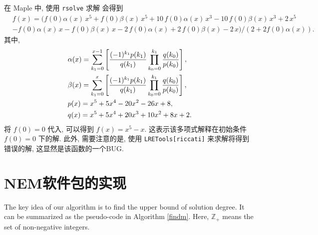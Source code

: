 \begin{example}
在 Maple 中, 使用 \texttt{rsolve} 求解  会得到
\begin{equation}
\begin{split}
    &f(x)=(f \left( 0 \right) \alpha(x)\,{x}^{5}+f \left( 0 \right) \beta(x)\,{x}^{5}+10\,f \left( 0 \right) \alpha(x)\,{x}^{3}-10\,f \left( 0 \right) \beta(x)\,{x}^{3}+2\,{x}^{5}\\
    &-f \left( 0 \right) \alpha(x)\,x-f \left( 0 \right) \beta(x)\,x-2\,f \left( 0 \right) \alpha(x)+2\,f \left( 0 \right) \beta(x)-2\,x)/(2+2f(0)\alpha(x)) . 
\end{split} \label{rasol_real}
\end{equation}
其中,
\begin{equation}
\begin{split}
&\alpha(x)=\sum_{k_1=0}^{x-1}\left[
    \frac{(-1)^{k_1}p(k_1)}{q(k_1)}\prod_{k_0=0}^{k_1}{
        \frac{q(k_0)}{p(k_0)}
    }
\right], \\
&\beta(x)=\sum_{k_1=0}^{x}\left[
    \frac{(-1)^{k_1}p(k_1)}{q(k_1)}\prod_{k_0=0}^{k_1}{
        \frac{q(k_0)}{p(k_0)}
    }
\right], \\
&p(x)=x^5+5x^4-20x^2-26x+8, \\
&q(x)=x^5+5x^4+20x^3+10x^2+8x+2. 
\end{split}
\end{equation}
将 $f(0)=0$ 代入, 可以得到 $f(x)=x^5-x$. 这表示该多项式解释在初始条件 $f(0)=0$ 下的解. 此外, 需要注意的是, 使用 \texttt{LRETools[riccati]} 来求解将得到错误的解, 这显然是该函数的一个BUG. 
\end{example}

\section{NEM软件包的实现}

The key idea of our algorithm is to find the upper bound of solution degree. It can be summarized as the pseudo-code in Algorithm \ref{findm}. Here, $\mathbb Z_+$ means the set of non-negative integers.

